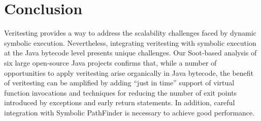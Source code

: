 \section{Conclusion}
Veritesting provides a way to address the scalability challenges faced by dynamic symbolic execution.
%
Nevertheless, integrating veritesting with symbolic execution at the Java bytecode level presents unique challenges.
%
Our Soot-based analysis of six large open-source Java projects confirms that, while a number of opportunities to apply veritesting arise organically in Java bytecode, the benefit of veritesting can be amplified by adding ``just in time'' support of virtual function invocations and techniques for reducing the number of exit points introduced by exceptions and early return statements.  In addition, careful integration with Symbolic PathFinder is necessary to achieve good performance.
%
%
%
